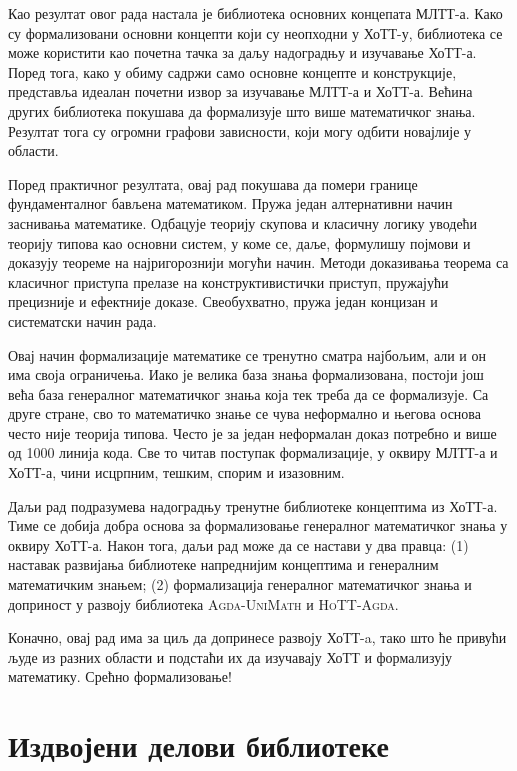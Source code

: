 \documentclass[12pt,oneside]{memoir}
\begin{document}
Као резултат овог рада настала је библиотека основних концепата МЛТТ-а. Како су формализовани основни концепти који су неопходни у ХоТТ-у, библиотека се може користити као почетна тачка за даљу надоградњу и изучавање ХоТТ-а. Поред тога, како у обиму садржи само основне концепте и конструкције, представља идеалан почетни извор за изучавање МЛТТ-а и ХоТТ-а. Већина других библиотека покушава да формализује што више математичког знања. Резултат тога су огромни графови зависности, који могу одбити новајлије у области. 

Поред практичног резултата, овај рад покушава да помери границе фундаменталног бављена математиком. Пружа један алтернативни начин заснивања математике. Одбацује теорију скупова и класичну логику уводећи теорију типова као основни систем, у коме се, даље, формулишу појмови и доказују теореме на најригорознији могући начин. Методи доказивања теорема са класичног приступа прелазе на конструктивистички приступ, пружајући прецизније и ефектније доказе. Свеобухватно, пружа један концизан и систематски начин рада.

Овај начин формализације математике се тренутно сматра најбољим, али и он има своја ограничења. Иако је велика база знања формализована, постоји још већа база генералног математичког знања која тек треба да се формализује. Са друге стране, сво то математичко знање се чува неформално и његова основа често није теорија типова. Често је за један неформалан доказ потребно и више од 1000 линија кода. Све то читав поступак формализације, у оквиру МЛТТ-а и ХоТТ-а, чини исцрпним, тешким, спорим и изазовним.

Даљи рад подразумева надоградњу тренутне библиотеке концептима из ХоТТ-а. Тиме се добија добра основа за формализовање генералног математичког знања у оквиру ХоТТ-а. Након тога, даљи рад може да се настави у два правца: (1) наставак развијања библиотеке напреднијим концептима и генералним математичким знањем; (2) формализација генералног математичког знања и доприност у развоју библиотека \textsc{Agda-UniMath} и \textsc{HoTT-Agda}.

Коначно, овај рад има за циљ да допринесе развоју ХоТТ-a, тако што ће привући људе из разних области и подстаћи их да изучавају ХоТТ и формализују математику. Срећно формализовање! 

\appendix

\chapter{Издвојени делови библиотеке}
\label{chp:appendix}
\end{document}
